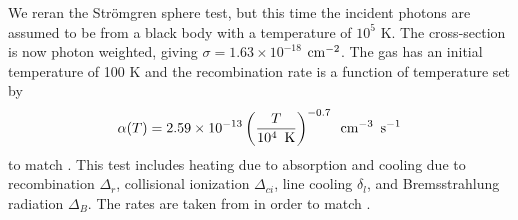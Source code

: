 \documentclass[fleq,usenatbib]{mnras}
\newcommand{\strom}{Str\"omgren}
\begin{document}
{We reran the \strom{} sphere test, but this time the incident photons are 
assumed to be from a black body with a temperature of $10^5$ K. The 
cross-section is now photon weighted, giving 
$\sigma = 1.63 \times 10^{-18}$ $\rm cm^{-2}$. The gas has an initial 
temperature of 100 K and the recombination rate is a function of temperature 
set by
\begin{equation}
\alpha(T) = 2.59 \times 10^{-13} \left( \frac{T}{10^4 \hspace{5pt} 
{\rm K}}\right)^{-0.7} \hspace{5pt} {\rm cm}^{-3} \hspace{5pt} {\rm s}^{-1}
\end{equation}
to match \cite{petkovaSpringel09}. This test includes heating due to 
absorption and cooling due to recombination $\Delta_r$, collisional 
ionization $\Delta_{ci}$, line cooling $\delta_l$, and Bremsstrahlung 
radiation $\Delta_B$. The rates are taken from \cite{cen92} in order to
match \cite{petkovaSpringel09}.

}
\end{document}
